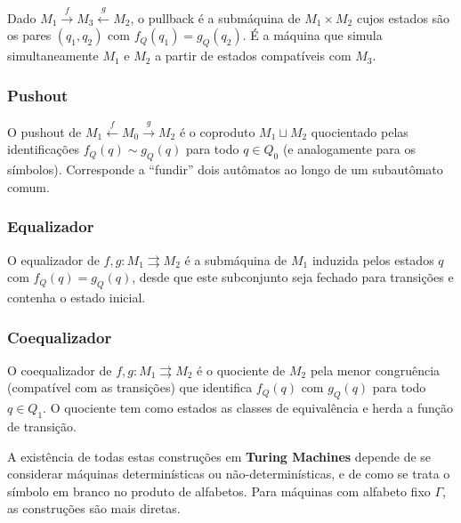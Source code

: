 Dado $M_1 \xrightarrow{f} M_3 \xleftarrow{g} M_2$, o pullback é a submáquina de $M_1 \times M_2$ cujos estados são os pares $(q_1, q_2)$ com $f_Q(q_1) = g_Q(q_2)$. É a máquina que simula simultaneamente $M_1$ e $M_2$ a partir de estados compatíveis com $M_3$.

\subsubsection{Pushout}

O pushout de $M_1 \xleftarrow{f} M_0 \xrightarrow{g} M_2$ é o coproduto $M_1 \sqcup M_2$ quocientado pelas identificações $f_Q(q) \sim g_Q(q)$ para todo $q \in Q_0$ (e analogamente para os símbolos). Corresponde a ``fundir'' dois autômatos ao longo de um subautômato comum.

\subsubsection{Equalizador}

O equalizador de $f, g: M_1 \rightrightarrows M_2$ é a submáquina de $M_1$ induzida pelos estados $q$ com $f_Q(q) = g_Q(q)$, desde que este subconjunto seja fechado para transições e contenha o estado inicial.

\subsubsection{Coequalizador}

O coequalizador de $f, g: M_1 \rightrightarrows M_2$ é o quociente de $M_2$ pela menor congruência (compatível com as transições) que identifica $f_Q(q)$ com $g_Q(q)$ para todo $q \in Q_1$. O quociente tem como estados as classes de equivalência e herda a função de transição.

\begin{remark}
A existência de todas estas construções em \textbf{Turing Machines} depende de se considerar máquinas determinísticas ou não-determinísticas, e de como se trata o símbolo em branco no produto de alfabetos. Para máquinas com alfabeto fixo $\Gamma$, as construções são mais diretas.
\end{remark}
